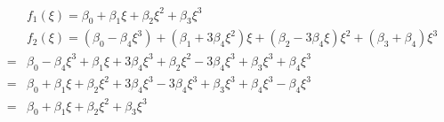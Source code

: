 \documentclass[10pt]{article}
\begin{document}
\begin{align*}&f_1(\xi) = \beta_0 + \beta_1 \xi + \beta_2 \xi^2 + \beta_3 \xi^3
\\
&f_2(\xi) = (\beta_0 - \beta_4 \xi^3) + (\beta_1 + 3 \beta_4 \xi^2) \xi + (\beta_2 - 3 \beta_4 \xi) \xi^2 + (\beta_3 + \beta_4) \xi^3
\\
= &\beta_0 - \beta_4 \xi^3 + \beta_1 \xi + 3 \beta_4 \xi^3 + \beta_2 \xi^2 - 3 \beta_4 \xi^3 + \beta_3 \xi^3 + \beta_4 \xi^3
\\
= &\beta_0 + \beta_1 \xi + \beta_2 \xi^2 + 3 \beta_4 \xi^3 - 3 \beta_4 \xi^3 + \beta_3 \xi^3 + \beta_4 \xi^3 - \beta_4 \xi^3
\\
= &\beta_0 + \beta_1 \xi + \beta_2 \xi^2 + \beta_3 \xi^3
\end{align*}
\end{document}
